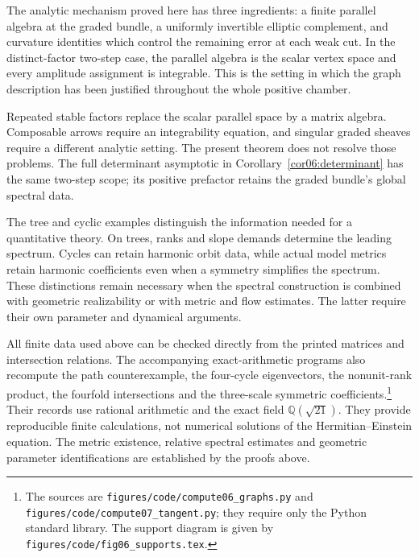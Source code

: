 \documentclass[11pt]{amsart}
\theoremstyle{definition}
\theoremstyle{remark}
\begin{document}
The analytic mechanism proved here has three ingredients: a finite
parallel algebra at the graded bundle, a uniformly invertible
elliptic complement, and curvature identities which control the
remaining error at each weak cut. In the distinct-factor two-step
case, the parallel algebra is the scalar vertex space and every
amplitude assignment is integrable. This is the setting in which
the graph description has been justified throughout the whole
positive chamber.

Repeated stable factors replace the scalar parallel space by a
matrix algebra. Composable arrows require an integrability
equation, and singular graded sheaves require a different analytic
setting. The present theorem does not resolve those problems.
The full determinant asymptotic in
Corollary~\ref{cor06:determinant} has the same two-step scope;
its positive prefactor retains the graded bundle's global
spectral data.

The tree and cyclic examples distinguish the information needed
for a quantitative theory. On trees, ranks and slope demands
determine the leading spectrum. Cycles can retain harmonic orbit
data, while actual model metrics retain harmonic coefficients
even when a symmetry simplifies the spectrum. These distinctions
remain necessary when the spectral construction is combined
with geometric realizability or with metric and flow estimates.
The latter require their own parameter and dynamical arguments.

All finite data used above can be checked directly from the
printed matrices and intersection relations. The accompanying
exact-arithmetic programs also recompute the path counterexample,
the four-cycle eigenvectors, the nonunit-rank product, the
fourfold intersections and the three-scale symmetric
coefficients.\footnote{The sources are
\texttt{figures/code/compute06\_graphs.py} and
\texttt{figures/code/compute07\_tangent.py}; they require only
the Python standard library. The support diagram is given by
\texttt{figures/code/fig06\_supports.tex}.}
Their records use rational arithmetic and the exact field
\(\mathbb Q(\sqrt{21})\). They provide reproducible finite
calculations, not numerical solutions of the
Hermitian--Einstein equation. The metric existence, relative
spectral estimates and geometric parameter identifications
are established by the proofs above.
\end{document}
